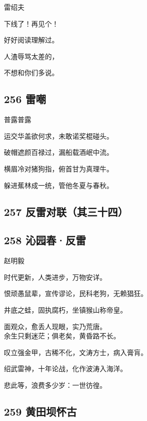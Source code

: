 {雷绍夫}

下线了！再见个！

好好阅读理解过。

人渣辱骂太差的，

不想和你们多说。

\hypertarget{ux96f7ux5632}{%
\subsection{256 雷嘲}\label{ux96f7ux5632}}

{普露普露}

运交华盖欲何求，未敢诺奖棍碰头。

破帽遮颜百禄过，漏船载酒岷中流。

横眉冷对猪狗指，俯首甘为真理牛。

躲进蕉林成一统，管他冬夏与春秋。

\hypertarget{ux53cdux96f7ux5bf9ux8054ux5176ux4e09ux5341ux56db}{%
\subsection{257
反雷对联（其三十四）}\label{ux53cdux96f7ux5bf9ux8054ux5176ux4e09ux5341ux56db}}

\hypertarget{ux6c81ux56edux6625ux53cdux96f7-1}{%
\subsection{258 沁园春·反雷}\label{ux6c81ux56edux6625ux53cdux96f7-1}}

{赵明毅}

时代更新，人类进步，万物安详。

恨顽愚鼠辈，宣传谬论，民科老狗，无赖猖狂。

井底之蛙，固执腐朽，坐镇猴山称帝皇。

面观众，愈丢人现眼，实乃荒唐。 ~\\
余生只剩迷茫；俱老矣，黄昏路不长。

叹立强金甲，古稀不化，文涛方士，病入膏肓。

绍武雷神，十年论战，化作波涛入海洋。

悲此等，浪费多少岁：一世彷徨。 ~\\

\hypertarget{ux9ec4ux7530ux575dux6000ux53e4}{%
\subsection{259 黄田坝怀古}\label{ux9ec4ux7530ux575dux6000ux53e4}}

